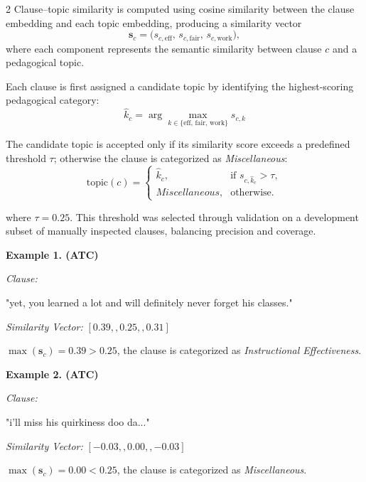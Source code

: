 \documentclass{article}
\begin{document}
\begin{multicols*}{2}
Clause–topic similarity is computed using cosine similarity between the clause embedding and each topic embedding, producing a similarity vector
\begin{equation}
\mathbf{s}_c = \big( s_{c,\text{eff}},\, s_{c,\text{fair}},\, s_{c,\text{work}} \big),
\end{equation}
where each component represents the semantic similarity between clause $c$ and a pedagogical topic.

Each clause is first assigned a candidate topic by identifying the highest-scoring pedagogical category:
\begin{equation}
\hat{k}_c = \arg\max_{k \in \{\text{eff},\,\text{fair},\,\text{work}\}} s_{c,k}
\end{equation}

The candidate topic is accepted only if its similarity score exceeds a predefined threshold $\tau$; otherwise the clause is categorized as \textit{Miscellaneous}:
\begin{equation}
\text{topic}(c) =
\begin{cases}
\hat{k}_c, & \text{if } s_{c,\hat{k}_c} > \tau, \\
\textit{Miscellaneous}, & \text{otherwise}.
\end{cases}
\end{equation}

where $\tau = 0.25$. This threshold was selected through validation on a development subset of manually inspected clauses, balancing precision and coverage.\newline


\textbf{Example 1. (ATC)}

\textit{Clause:}

"yet, you learned a lot and will definitely never forget his classes."

\textit{Similarity Vector:} $[0.39,,0.25,,0.31]$

$\max(\mathbf{s}_c) = 0.39 > 0.25$, the clause is categorized as \textit{Instructional Effectiveness}.\newline

\textbf{Example 2. (ATC)}

\textit{Clause:}

"i'll miss his quirkiness doo da..."

\textit{Similarity Vector:} $[-0.03,,0.00,,-0.03]$

$\max(\mathbf{s}_c) = 0.00 < 0.25$, the clause is categorized as \textit{Miscellaneous}.\newline


\end{multicols*}
\end{document}
